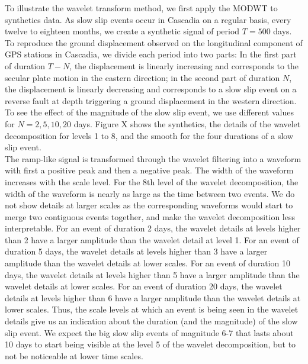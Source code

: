 \documentclass[draft]{agujournal2018}
\begin{document}
To illustrate the wavelet transform method, we first apply the MODWT to synthetics data. As slow slip events occur in Cascadia on a regular basis, every twelve to eighteen months, we create a synthetic signal of period $T = 500$ days. To reproduce the ground displacement observed on the longitudinal component of GPS stations in Cascadia, we divide each period into two parts: In the first part of duration $T - N$, the displacement is linearly increasing and corresponds to the secular plate motion in the eastern direction; in the second part of duration $N$, the displacement is linearly decreasing and corresponds to a slow slip event on a reverse fault at depth triggering a ground displacement in the western direction. To see the effect of the magnitude of the slow slip event, we use different values for $N = 2, 5, 10, 20$ days. Figure X shows the synthetics, the details of the wavelet decomposition for levels 1 to 8, and the smooth for the four durations of a slow slip event. \\


The ramp-like signal is transformed through the wavelet filtering into a waveform with first a positive peak and then a negative peak. The width of the waveform increases with the scale level. For the 8th level of the wavelet decomposition, the width of the waveform is nearly as large as the time between two events. We do not show details at larger scales as the corresponding waveforms would start to merge two contiguous events together, and make the wavelet decomposition less interpretable. For an event of duration 2 days, the wavelet details at levels higher than 2 have a larger amplitude than the wavelet detail at level 1. For an event of duration 5 days, the wavelet details at levels higher than 3 have a larger amplitude than the wavelet details at lower scales. For an event of duration 10 days, the wavelet details at levels higher than 5 have a larger amplitude than the wavelet details at lower scales. For an event of duration 20 days, the wavelet details at levels higher than 6 have a larger amplitude than the wavelet details at lower scales. Thus, the scale levels at which an event is being seen in the wavelet details give us an indication about the duration (and the magnitude) of the slow slip event. We expect the big slow slip events of magnitude 6-7 that lasts about 10 days to start being visible at the level 5 of the wavelet decomposition, but to not be noticeable at lower time scales. \\
\end{document}
